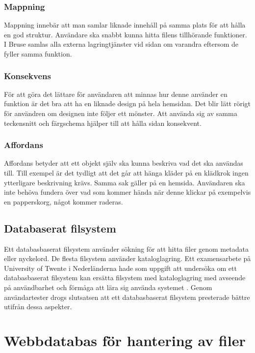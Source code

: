 \documentclass[a4paper,12pt,oneside,final]{extbook}
\begin{document}
\subsection{Mappning}
Mappning innebär att man samlar liknade innehåll på samma plats för att hålla en god struktur\cite{norman}. Användare ska snabbt kunna hitta filens tillhörande funktioner. I Bruse samlas alla externa lagringtjänster vid sidan om varandra eftersom de fyller samma funktion.

\subsection{Konsekvens}
För att göra det lättare för användaren att minnas hur denne använder en funktion är det bra att ha en liknade design på hela hemsidan. Det blir lätt rörigt för användren om designen inte följer ett mönster. Att använda sig av samma teckensnitt och färgschema hjälper till att hålla sidan konsekvent\cite{norman}.

\subsection{Affordans}
Affordans betyder att ett objekt själv ska kunna beskriva vad det ska användas till. Till exempel är det tydligt att det går att hänga kläder på en klädkrok\cite{norman} ingen ytterligare beskrivning krävs. Samma sak gäller på en hemsida. Användaren ska inte behöva fundera över vad som kommer hända när denne klickar på exempelvis en papperskorg, något kommer raderas.

\section{Databaserat filsystem}
Ett databasbaserat filsystem använder sökning för att hitta filer genom metadata eller nyckelord. De flesta filsystem använder kataloglagring. Ett examensarbete på University of Twente i Nederländerna hade som uppgift att undersöka om ett databasbaserat filsystem kan ersätta filsystem med kataloglagring med avseende på användbarhet och förmåga att lära sig använda systemet \cite{twente}. Genom användartester drogs slutsatsen att ett databasbaserat filsystem presterade bättre utifrån dessa aspekter.

\chapter{Webbdatabas för hantering av filer}
\end{document}

